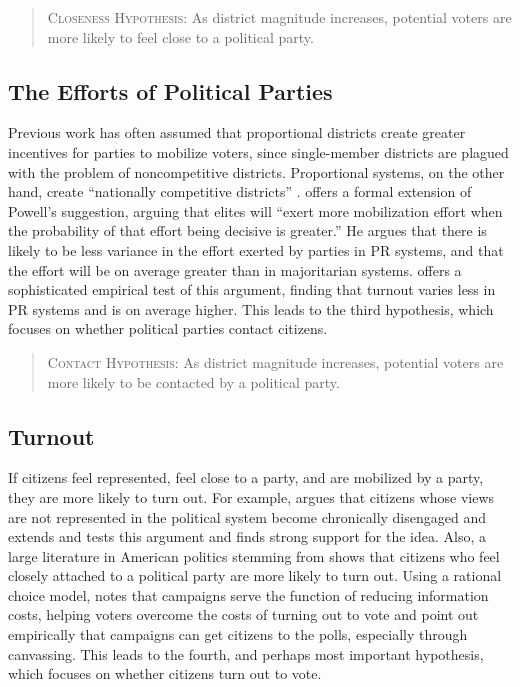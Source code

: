 \documentclass[12pt]{article}
\begin{document}
\begin{quote}
        \textsc{Closeness Hypothesis:} As district magnitude increases, potential voters are more likely to feel close to a political party.
\end{quote}

\subsection*{The Efforts of Political Parties}

Previous work has often assumed that proportional districts create greater incentives for parties to mobilize voters, since single-member districts are plagued with the problem of noncompetitive districts. Proportional systems, on the other hand, create ``nationally competitive districts'' \citep{Powell1982}. \cite{Cox1999} offers a formal extension of Powell's suggestion, arguing that elites will ``exert more mobilization effort when the probability of that effort being decisive is greater.'' He argues that there is likely to be less variance in the effort exerted by parties in PR systems, and that the effort will be on average greater than in majoritarian systems. \cite{Selb2009} offers a sophisticated empirical test of this argument, finding that turnout varies less in PR systems and is on average higher. This leads to the third hypothesis, which focuses on whether political parties contact citizens.

\begin{quote}
        \textsc{Contact Hypothesis:} As district magnitude increases, potential voters are more likely to be contacted by a political party.
\end{quote}

\subsection*{Turnout}

If citizens feel represented, feel close to a party, and are mobilized by a party, they are more likely to turn out. For example, \cite{Schattschneider1960} argues that citizens whose views are not represented in the political system become chronically disengaged and \cite{Solt2008, Solt2010} extends and tests this argument and finds strong support for the idea. Also, a large literature in American politics stemming from \cite{Campbelletal1960} shows that citizens who feel closely attached to a political party are more likely to turn out. Using a rational choice model, \cite{Downs1957} notes that campaigns serve the function of reducing information costs, helping voters overcome the costs of turning out to vote and \cite{GerberGreen2000} point out empirically that campaigns can get citizens to the polls, especially through canvassing. This leads to the fourth, and perhaps most important hypothesis, which focuses on whether citizens turn out to vote.
\end{document}
